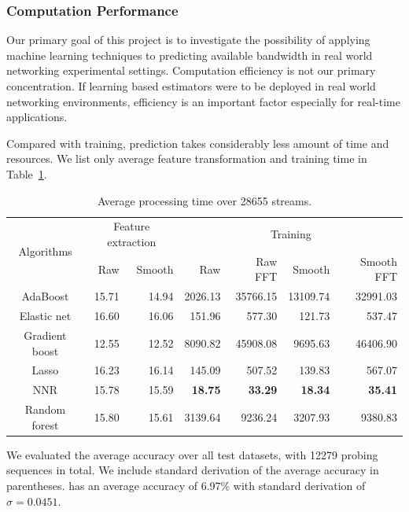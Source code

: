 \subsubsection{Computation Performance}
\label{ssub:computation_performance}

Our primary goal of this project is to investigate the possibility of applying
machine learning techniques to predicting available bandwidth in real world
networking experimental settings. Computation efficiency is not our primary
concentration. If learning based estimators were to be deployed in real world
networking environments, efficiency is an important factor especially for
real-time applications.

Compared with training, prediction takes considerably less amount of time and
resources. We list only average feature transformation and training time in
Table~\ref{tab:timing}.

\begin{table}[htpb]
   \centering
   \caption{Average processing time over 28655 streams.}
   \label{tab:timing}
   \begin{tabular}{|c|r|r|r|r|r|r|}
      \hline
      \multirow{2}{*}{Algorithms} & \multicolumn{2}{c|}{Feature extraction} &
      \multicolumn{4}{c|}{Training} \\ \cline{2-7}
                       & Raw   & Smooth & Raw            & Raw FFT        & Smooth         & Smooth FFT \\ \hline
      AdaBoost         & 15.71 & 14.94  & 2026.13        & 35766.15       & 13109.74       & 32991.03\\
      Elastic net      & 16.60 & 16.06  & 151.96         & 577.30         & 121.73         & 537.47\\
      Gradient boost   & 12.55 & 12.52  & 8090.82        & 45908.08       & 9695.63        & 46406.90\\
      Lasso            & 16.23 & 16.14  & 145.09         & 507.52         & 139.83         & 567.07\\
      NNR              & 15.78 & 15.59  & \textbf{18.75} & \textbf{33.29} & \textbf{18.34} & \textbf{35.41}\\
      Random forest    & 15.80 & 15.61  & 3139.64        & 9236.24        & 3207.93        & 9380.83\\
      \hline
   \end{tabular}
\end{table}

We evaluated the average accuracy over all test datasets, with 12279 probing
sequences in total. We include standard derivation of the average
accuracy in parentheses. \cite{Yin2014} has an average accuracy of 6.97\%
with standard derivation of $\sigma=0.0451$.

